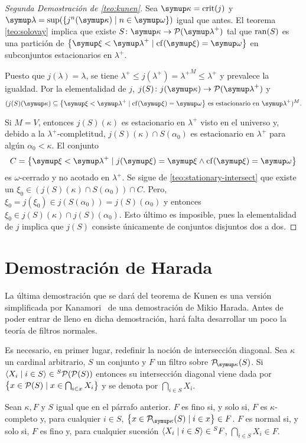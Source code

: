 \begin{proof}[Segunda Demostración de \ref{teo:kunen}]
	Sea $\kappa=\crit{j}$ y $\lambda=\sup(\set{j^n(\kappa)\mid n\in\omega})$ igual que antes.
	El teorema \ref{teo:solovay} implica que existe $S\colon\kappa\to\pwset{\lambda^+}$ tal que
	$\operatorname{ran}(S)$ es una partición de $\set{\xi < \lambda^+\mid \cf(\xi) = \omega}$ en subconjuntos
	estacionarios en $\lambda^+$.

	Puesto que $j(\lambda)=\lambda$, se tiene $\lambda^+\leq j(\lambda^+) = {\lambda^+}^M\leq \lambda^+$
	y prevalece la igualdad. Por la elementalidad de $j$, $j(S)\colon j(\kappa)\to\pwset{\lambda^+}$ y
	\[
		(
		    j(S)(\kappa)\subseteq\set{\xi < \lambda^+\mid \cf(\xi) = \omega}
		    \,\text{es estacionario en $\lambda^+$}
		)^M.
	\]

	Si $M=V$, entonces $j(S)(\kappa)$ es estacionario en $\lambda^+$ visto en el universo y,
	debido a la $\lambda^+$-completitud, $j(S)(\kappa)\cap S(\alpha_0)$ es estacionario en $\lambda^+$
	para algún $\alpha_0<\kappa$. El conjunto
	\[
	    C = \set{\xi<\lambda^+\mid j(\xi)=\xi \land \cf(\xi)=\omega}
	\]
	es $\omega$-cerrado y no acotado en $\lambda^+$. Se sigue de \ref{teo:stationary-intersect} que
	existe un $\xi_0\in (j(S)(\kappa)\cap S(\alpha_0))\cap C$. Pero,
	$\xi_0 = j(\xi_0)\in j(S(\alpha_0)) = j(S)(\alpha_0)$ y entonces $\xi_0\in j(S)(\kappa)\cap j(S)(\alpha_0)$.
	Esto último es imposible, pues la elementalidad de $j$ implica que $j(S)$ consiste únicamente de conjuntos
	disjuntos dos a dos.
\end{proof}

\section{Demostración de Harada}

La última demostración que se dará del teorema de Kunen es una versión simplificada
por Kanamori~\autocite{kanamori_higher_2009} de una demostración de Mikio Harada.
Antes de poder entrar de lleno en dicha demostración, hará falta desarrollar
un poco la teoría de filtros normales.

Es necesario, en primer lugar, redefinir la noción de intersección diagonal.
Sea $\kappa$ un cardinal arbitrario, $S$ un conjunto y $F$ un filtro sobre $\pwset[\kappa]{S}$.
Si $\seq{X_i\mid i\in S}\in {}^S\pwset{\pwset S}$ entonces su intersección diagonal viene
dada por $\set{x\in\pwset{S}\mid x\in\bigcap_{i\in x} X_i}$ y se denota por $\dint_{i\in S} X_i$.

\begin{defi}
    Sean $\kappa, F$ y $S$ igual que en el párrafo anterior.
    $F$ es fino si, y solo si, $F$ es $\kappa$-completo y, para cualquier $i\in S$,
    $\set{x\in\pwset[\kappa]{S}\mid i\in x}\in F$.
    $F$ es normal si, y solo si, $F$ es fino y, para cualquier sucesión
    $\langle X_i\mid i\in S \rangle\in {}^SF$, $\dint_{i\in S} X_i\in F$.
\end{defi}

